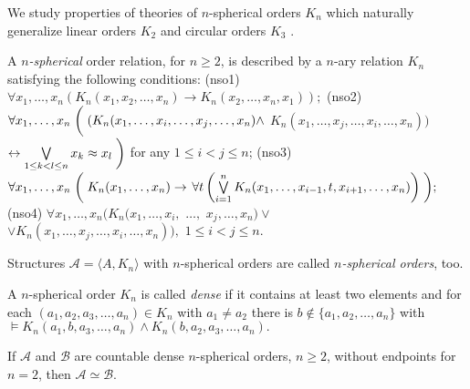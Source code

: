 \documentclass[bsl,meeting]{asl}
\def\urladdr#1{\endgraf\noindent{\it URL Address}: {\tt #1}.}
\newcommand{\NP}{}
\begin{document}
\thispagestyle{empty}


\NP {} 


 



\noindent


We study properties of theories of $n$-spherical orders $K_n$
\cite{aafot, ananat} which naturally generalize linear orders
$K_2$ and circular orders $K_3$ \cite{KulMac, Kulp3, Kulp4}.

A {\em $n$-spherical} order relation, for $n\geq 2$, is described
by a $n$-ary relation $K_n$ satisfying the following conditions:
 (nso1) $\forall x_1,\ldots,x_n (K_n(x_1,x_2,\ldots,x_n)\to K_n(x_2,\ldots,x_n,x_1));$
 (nso2) $\forall x_1,\ldots,x_n
 \biggm((K_n(x_1,\ldots,x_i,\ldots,x_j,\ldots,x_n)\land$
 $K_n(x_1,\ldots,x_j,\ldots,x_i,\ldots,x_n))$ $\leftrightarrow\bigvee\limits_{1\leq k<l\leq n} x_k\approx x_l\biggm)$ for any $1\leq i<j\leq n$;
 (nso3) $\forall x_1,\ldots,x_n\biggm(K_n(x_1,\ldots,x_n)\to$
 $\forall t\left(\bigvee\limits_{i=1}^nK_n(x_1,\ldots,x_{i-1},t,x_{i+1},\ldots,x_n)\right)\biggm);$
 (nso4) $\forall x_1,\ldots,x_n (K_n(x_1,\ldots,x_i,$ $\ldots,$ $x_j,\ldots,x_n)\lor$
 $\lor K_n(x_1,\ldots,x_j,\ldots,x_i,\ldots,x_n)),\,\, 1\leq i<j\leq
 n.$

Structures $\mathcal{A}=\langle A,K_n\rangle$ with $n$-spherical
orders are called {\em $n$-spherical orders}, too.

A $n$-spherical order $K_n$ is called {\em dense} if it contains
at least two elements and for each $(a_1,a_2,a_3,\ldots,a_n)\in
K_n$ with $a_1\ne a_2$ there is $b\notin\{a_1,a_2,\ldots,a_n\}$
with
$
\models K_n(a_1,b,a_3,\ldots,a_n)\wedge K_n(b,a_2,a_3,\ldots,a_n).
$

\begin{theorem}\label{th_dense_isom}
If $\mathcal{A}$ and $\mathcal{B}$ are countable dense
$n$-spherical orders, $n\geq 2$, without endpoints for $n=2$, then
$\mathcal{A}\simeq\mathcal{B}$.
\end{theorem}
\end{document}
